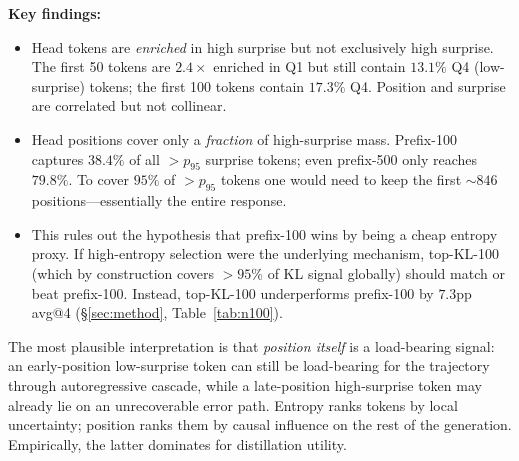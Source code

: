 \documentclass[10pt]{article}
\begin{document}
\textbf{Key findings:}
\begin{itemize}
\item Head tokens are \emph{enriched} in high surprise but not exclusively high surprise. The first 50 tokens are $2.4\times$ enriched in Q1 but still contain $13.1\%$ Q4 (low-surprise) tokens; the first 100 tokens contain $17.3\%$ Q4. Position and surprise are correlated but not collinear.
\item Head positions cover only a \emph{fraction} of high-surprise mass. Prefix-100 captures $38.4\%$ of all $>p_{95}$ surprise tokens; even prefix-500 only reaches $79.8\%$. To cover $95\%$ of $>p_{95}$ tokens one would need to keep the first $\sim$$846$ positions---essentially the entire response.
\item This rules out the hypothesis that prefix-100 wins by being a cheap entropy proxy. If high-entropy selection were the underlying mechanism, top-KL-100 (which by construction covers $>95\%$ of KL signal globally) should match or beat prefix-100. Instead, top-KL-100 underperforms prefix-100 by $7.3$pp avg@4 (\S\ref{sec:method}, Table~\ref{tab:n100}).
\end{itemize}

The most plausible interpretation is that \emph{position itself} is a load-bearing signal: an early-position low-surprise token can still be load-bearing for the trajectory through autoregressive cascade, while a late-position high-surprise token may already lie on an unrecoverable error path. Entropy ranks tokens by local uncertainty; position ranks them by causal influence on the rest of the generation. Empirically, the latter dominates for distillation utility.
\end{document}
